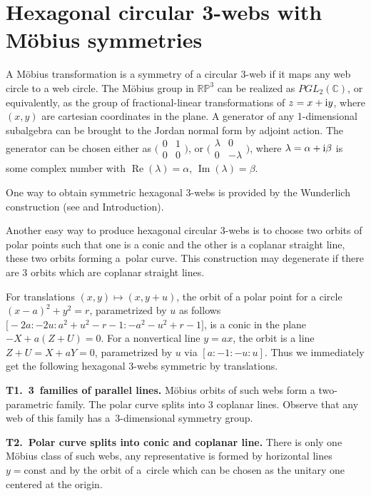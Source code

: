 \documentclass[pdftex]{sigma}
\numberwithin{equation}{section}
\begin{document}
\section{Hexagonal circular 3-webs with M\"obius symmetries}\label{symetric webs}
 A M\"obius transformation is a symmetry of a circular 3-web if it maps any web circle to a web circle.
The M\"obius group in $\mathbb{RP}^3$ can be realized as $PGL_2(\mathbb{C})$, or equivalently, as the group of fractional-linear transformations of $z=x+{\rm i}y$, where $(x,y)$ are cartesian coordinates in the plane. A generator of any 1-dimensional subalgebra can be brought to the Jordan normal form by adjoint action. The generator can be chosen either as
$
\big(
\begin{smallmatrix}
0&1\\
0&0
\end{smallmatrix}
\big)$, or $
\big(
\begin{smallmatrix}
\lambda &0\\
0&-\lambda
\end{smallmatrix}
\big)$,
where $\lambda=\alpha+{\rm i}\beta$ is some complex number with $\operatorname{Re}(\lambda)=\alpha$, $\operatorname{Im}(\lambda)=\beta$.


One way to obtain symmetric hexagonal 3-webs is provided by the Wunderlich construction (see \cite{W-38} and Introduction).


Another easy way to produce hexagonal circular 3-webs is to choose two orbits of polar points such that one is a conic and the other is a coplanar straight line, these two orbits forming a~polar curve. This construction may degenerate if there are 3 orbits which are coplanar straight lines.

For translations $(x,y)\mapsto (x,y+u)$, the orbit of a polar point for a circle $(x-a)^2+y^2=r$, parametrized by $u$ as follows $\bigl[-2a:-2u: a^2+u^2-r-1: -a^2-u^2+r-1\bigr]$, is a conic in the plane $-X+a(Z+U)=0$. For a nonvertical line $y=ax$, the orbit is a line $Z+U=X+aY=0$, parametrized by $u$ via $[a:-1:-u:u]$.
Thus we immediately get the following hexagonal 3-webs symmetric by translations.



 {\bf T1.\ 3~families of parallel lines.}
 M\"obius orbits of such webs form a two-parametric family. The polar curve splits into 3 coplanar lines. Observe that any web of this family has a~3-dimensional symmetry group.


 {\bf T2.\ Polar curve splits into conic and coplanar line.}
 There is only one M\"obius class of such webs, any representative is formed by horizontal lines $y=\text{const}$ and by the orbit of a~circle which can be chosen as the unitary one centered at the origin.
\end{document}
